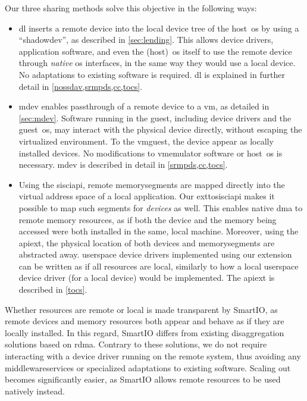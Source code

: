 \objtransparent*%
%
Our three sharing methods solve this objective in the following ways:
%
\begin{itemize}
    \item \Gls{dl} inserts a remote device into the local device tree of the \gls{host}~\gls{os} by using a ``\gls{shadowdev}'', as described in \cref{sec:lending}.
        This allows device drivers, application software, and even the (\gls{host})~\gls{os} itself to use the remote device through \emph{native} \gls{os} interfaces, in the same way they would use a local device.
        No adaptations to existing software is required.
        \Gls{dl} is explained in further detail in \cref{nossdav,srmpds,cc,tocs}.
    


    \item \Gls{mdev} enables \gls{passthrough} of a remote device to a \gls{vm}, as detailed in \cref{sec:mdev}.
        Software running in the \gls{guest}, including device drivers and the \gls{guest}~\gls{os}, may interact with the physical device directly, without escaping the virtualized environment.
        To the \gls{vmguest}, the device appear as locally installed devices.
        No modifications to \gls{vmemulator} software or \gls{host}~\gls{os} is necessary.
        \Gls{mdev} is described in detail in \cref{srmpds,cc,tocs}.


    \item Using the \gls{sisciapi}, remote \glspl{memorysegment} are mapped directly into the virtual address space of a local application.
        Our \gls{exttosisciapi} makes it possible to map such \glspl{segment} for \emph{devices} as well.
        This enables native \gls{dma} to remote memory resources, as if both the device and the memory being accessed were both installed in the same, local machine.
        Moreover, using the \gls{apiext}, the physical location of both devices and \glspl{memorysegment} are abstracted away.
        \Gls{userspace} device drivers implemented using our extension can be written as if all resources are local, similarly to how a local \gls{userspace} device driver (for a local device) would be implemented.
        The \gls{apiext} is described in \cref{tocs}.
\end{itemize}
%
Whether resources are remote or local is made transparent by SmartIO, as remote devices and memory resources both appear and behave as if they are locally installed.
%
In this regard, SmartIO differs from existing \gls{disaggregation} solutions based on \gls{rdma}.
%
Contrary to these solutions, we do not require interacting with a device driver running on the remote system, thus avoiding any \glspl{middlewareservice} or specialized adaptations to existing software.
%
Scaling out becomes significantly easier, as SmartIO allows remote resources to be used natively instead.



